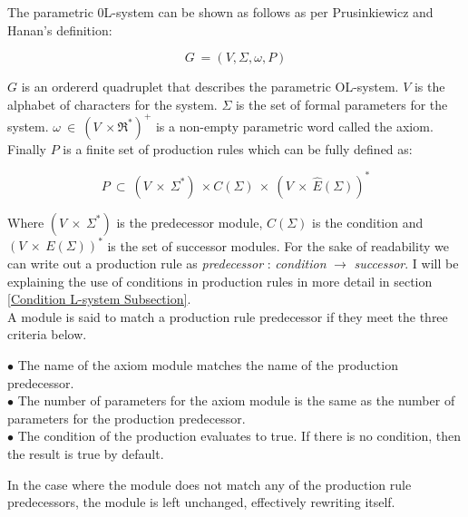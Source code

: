 \begin{flushleft}
The parametric 0L-system can be shown as follows as per Prusinkiewicz and Hanan's definition:\\

\vspace{5mm}

\begin{equation}
G~ = (V, \Sigma, \omega, P)
\end{equation}
\vspace{5mm}

$G$ is an ordererd quadruplet that describes the parametric OL-system. $V$ is the alphabet of characters for the system. $\Sigma$ is the set of formal parameters for the system. $\omega~ \in~ (V~ \times \Re^*)^+$ is a non-empty parametric word called the axiom. Finally $P$ is a finite set of production rules which can be fully defined as:

\vspace{5mm}

\begin{equation}
P~ \subset~ (V~ \times~ \Sigma^*)~ \times C(\Sigma)~ \times~ (V~ \times~ \hat{E}(\Sigma))^*
\end{equation}

\vspace{5mm} 

Where $(V~ \times~ \Sigma^*) $ is the predecessor module, $C(\Sigma) $ is the condition and $(V~ \times~ E(\Sigma))^* $ is the set of successor modules. For the sake of readability we can write out a production rule as \textit{predecessor} : \textit{condition} $\rightarrow$ \textit{successor}. I will be explaining the use of conditions in production rules in more detail in section \ref{Condition L-system Subsection}.\\
A module is said to match a production rule predecessor if they meet the three criteria below.

\vspace{5mm}

$\bullet$ The name of the axiom module matches the name of the production predecessor. \\
$\bullet$ The number of parameters for the axiom module is the same as the number of parameters for the production predecessor. \\
$\bullet$ The condition of the production evaluates to true. If there is no condition, then the result is true by default.\\

\vspace{5mm}

In the case where the module does not match any of the production rule predecessors, the module is left unchanged, effectively rewriting itself. \\

\end{flushleft}


